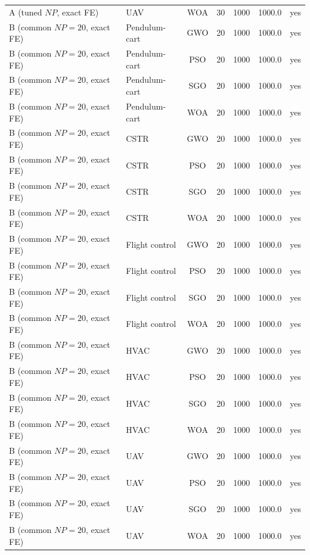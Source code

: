 \begin{table}[htbp]
\begin{tabular}{@{}llccccc@{}}
A (tuned $NP$, exact FE) & UAV & WOA & 30 & 1000 & 1000.0 & yes \\
B (common $NP{=}20$, exact FE) & Pendulum-cart & GWO & 20 & 1000 & 1000.0 & yes \\
B (common $NP{=}20$, exact FE) & Pendulum-cart & PSO & 20 & 1000 & 1000.0 & yes \\
B (common $NP{=}20$, exact FE) & Pendulum-cart & SGO & 20 & 1000 & 1000.0 & yes \\
B (common $NP{=}20$, exact FE) & Pendulum-cart & WOA & 20 & 1000 & 1000.0 & yes \\
B (common $NP{=}20$, exact FE) & CSTR & GWO & 20 & 1000 & 1000.0 & yes \\
B (common $NP{=}20$, exact FE) & CSTR & PSO & 20 & 1000 & 1000.0 & yes \\
B (common $NP{=}20$, exact FE) & CSTR & SGO & 20 & 1000 & 1000.0 & yes \\
B (common $NP{=}20$, exact FE) & CSTR & WOA & 20 & 1000 & 1000.0 & yes \\
B (common $NP{=}20$, exact FE) & Flight control & GWO & 20 & 1000 & 1000.0 & yes \\
B (common $NP{=}20$, exact FE) & Flight control & PSO & 20 & 1000 & 1000.0 & yes \\
B (common $NP{=}20$, exact FE) & Flight control & SGO & 20 & 1000 & 1000.0 & yes \\
B (common $NP{=}20$, exact FE) & Flight control & WOA & 20 & 1000 & 1000.0 & yes \\
B (common $NP{=}20$, exact FE) & HVAC & GWO & 20 & 1000 & 1000.0 & yes \\
B (common $NP{=}20$, exact FE) & HVAC & PSO & 20 & 1000 & 1000.0 & yes \\
B (common $NP{=}20$, exact FE) & HVAC & SGO & 20 & 1000 & 1000.0 & yes \\
B (common $NP{=}20$, exact FE) & HVAC & WOA & 20 & 1000 & 1000.0 & yes \\
B (common $NP{=}20$, exact FE) & UAV & GWO & 20 & 1000 & 1000.0 & yes \\
B (common $NP{=}20$, exact FE) & UAV & PSO & 20 & 1000 & 1000.0 & yes \\
B (common $NP{=}20$, exact FE) & UAV & SGO & 20 & 1000 & 1000.0 & yes \\
B (common $NP{=}20$, exact FE) & UAV & WOA & 20 & 1000 & 1000.0 & yes \\
\bottomrule
\end{tabular}
\end{table}
